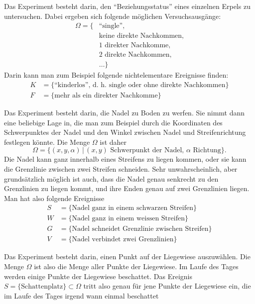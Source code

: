 \begin{loesung}
\begin{teilaufgaben}
\item Das Experiment besteht darin, den ``Beziehungsstatus'' eines
einzelnen Erpels zu untersuchen. Dabei ergeben sich folgende möglichen
Versuchsausgänge:
\begin{align*}
\Omega=\{&\text{``single''},\\
&\text{keine direkte Nachkommen},\\
&\text{1 direkter Nachkomme},\\
&\text{2 direkte Nachkommen},\\
&\dots \}
\end{align*}
Darin kann man zum Beispiel folgende nichtelementare Ereignisse finden:
\begin{align*}
K&=\{\text{``kinderlos'', d.~h.~single oder ohne direkte Nachkommen}\}\\
F&=\{\text{mehr als ein direkter Nachkomme}\}
\end{align*}
\item
Das Experiment besteht darin, die Nadel zu Boden zu werfen. Sie nimmt dann
eine beliebige Lage in, die man zum Beispiel durch die Koordinaten
des Schwerpunktes der Nadel und den Winkel zwischen Nadel und Streifenrichtung
festlegen könnte. Die Menge $\Omega$ ist daher
\[
\Omega=\{ (x,y,\alpha) \,|\, \text{$(x,y)$ Schwerpunkt der Nadel, $\alpha$ Richtung}\}.
\]
Die Nadel kann ganz innerhalb eines Streifens zu liegen kommen, oder sie
kann die Grenzlinie zwischen zwei Streifen schneiden. Sehr unwahrscheinlich,
aber grundsätzlich möglich ist auch, dass die Nadel genau senkrecht
zu den Grenzlinien zu liegen kommt, und ihre Enden genau auf zwei Grenzlinien
liegen. Man hat also folgende Ereignisse
\begin{align*}
S&=\{ \text{Nadel ganz in einem schwarzen Streifen}\}\\
W&=\{ \text{Nadel ganz in einem weissen Streifen}\}\\
G&=\{ \text{Nadel schneidet Grenzlinie zwischen Streifen}\}\\
V&=\{ \text{Nadel verbindet zwei Grenzlinien}\}
\end{align*}
\item
Das Experiment besteht darin, einen Punkt auf der Liegewiese auszuwählen.
Die Menge $\Omega$ ist also die Menge aller Punkte der Liegewiese.
Im Laufe des Tages werden einige Punkte der Liegewiese beschattet.
Das Ereignis $S=\{\text{Schattenplatz}\}\subset\Omega$
tritt also genau für jene Punkte
der Liegewiese ein, die im Laufe des Tages irgend wann einmal beschattet 

\end{teilaufgaben}
\end{loesung}
